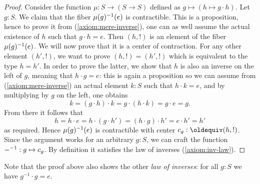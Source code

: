 \begin{proof}
  Consider the function $\mu: S \to (S \to S)$ defined as
  $g\mapsto (h \mapsto g\cdot h)$. Let $g:S$. We claim that the fiber
  $\mu(g)^{-1}(e)$ is contractible. This is a proposition, hence to
  prove it from (\ref{axiom:mere-inverse}), one can as well assume the
  actual existence of $h$ such that $g\cdot h = e$. Then $(h,!)$ is an
  element of the fiber $\mu(g)^{-1}(e)$. We will now prove that it is
  a center of contraction. For any other element $(h',!)$, we want to
  prove $(h,!) = (h',!)$ which is equivalent to the type $h=h'$. In
  order to prove the latter, we show that $h$ is also an inverse on
  the left of $g$, meaning that $h\cdot g=e$: this is again a
  proposition so we can assume from (\ref{axiom:mere-inverse}) an
  actual element $k:S$ such that $h\cdot k = e$, and by multiplying by
  $g$ on the left, one obtains
  \begin{displaymath}
    k = (g\cdot h)\cdot k = g\cdot (h\cdot k) = g\cdot e = g.
  \end{displaymath}
  From there it follows that
  \begin{displaymath}
    h = h \cdot e = h \cdot (g\cdot h') = (h \cdot g) \cdot h' = e\cdot
    h' = h'
  \end{displaymath}
  as required. Hence $\mu(g)^{-1}(e)$ is contractible with center
  $c_g \defequi (h,!)$. Since the argument works for an arbitrary $g:S$,
  we can craft the function ${-}^{-1} : g \mapsto c_g$. By
  definition it satisfies the law of inverses (\ref{axiom:inv-law}).
\end{proof}
Note that the proof above also shows the other \emph{law of inverses}:
for all $g:S$ we have $g^{-1}\cdot g=e$.

